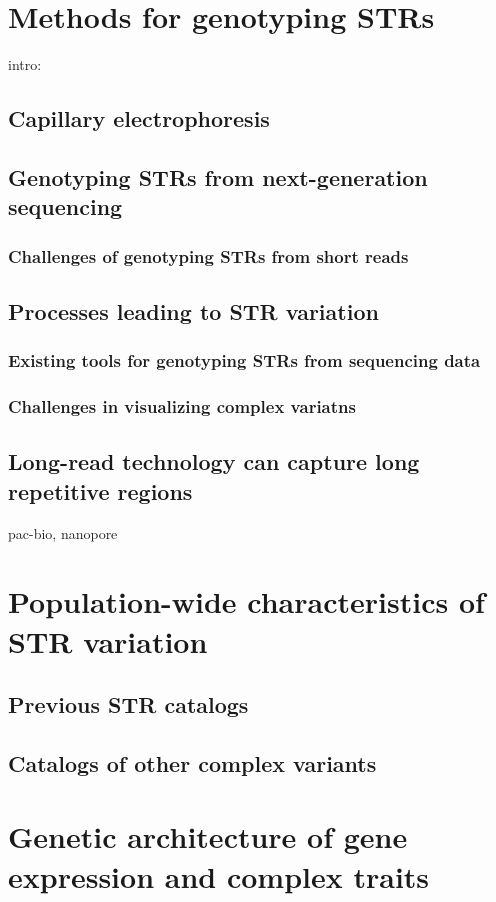 \section{Methods for genotyping STRs}
intro:
\subsection{Capillary electrophoresis}
\subsection{Genotyping STRs from next-generation sequencing}
\subsubsection{Challenges of genotyping STRs from short reads}
\subsection{Processes leading to STR variation}
\subsubsection{Existing tools for genotyping STRs from sequencing data}
\subsubsection{Challenges in visualizing complex variatns}
\subsection{Long-read technology can capture long repetitive regions}
pac-bio, nanopore

\section{Population-wide characteristics of STR variation}
\subsection{Previous STR catalogs}
\subsection{Catalogs of other complex variants}

\section{Genetic architecture of gene expression and complex traits}
